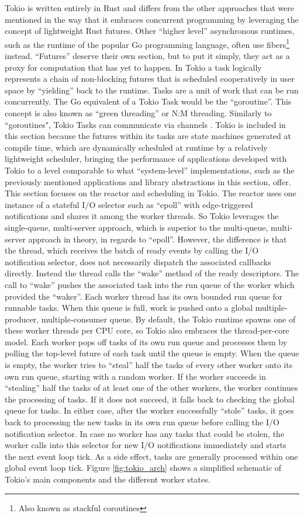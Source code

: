 Tokio is written entirely in Rust and differs from the other approaches that were mentioned in the way that it embraces concurrent programming by leveraging the concept of lightweight Rust futures. Other “higher level” asynchronous runtimes, such as the runtime of the popular Go programming language, often use fibers\footnote{Also known as stackful coroutines} instead. “Futures” deserve their own section, but to put it simply, they act as a proxy for computation that has yet to happen. In Tokio a task logically represents a chain of non-blocking futures that is scheduled cooperatively in user space by “yielding” back to the runtime. Tasks are a unit of work that can be run concurrently. The Go equivalent of a Tokio Task would be the “goroutine”. This concept is also known as “green threading” or N:M threading. Similarly to “goroutines", Tokio Tasks can communicate via channels \cite{doc:tokio_task}. Tokio is included in this section because the futures within its tasks are state machines generated at compile time, which are dynamically scheduled at runtime by a relatively lightweight scheduler, bringing the performance of applications developed with Tokio to a level comparable to what “system-level” implementations, such as the previously mentioned applications and library abstractions in this section, offer. This section focuses on the reactor and scheduling in Tokio. The reactor uses one instance of a stateful I/O selector such as “epoll” with edge-triggered notifications and shares it among the worker threads. So Tokio leverages the single-queue, multi-server approach, which is superior to the multi-queue, multi-server approach in theory, in regards to “epoll”. However, the difference is that the thread, which receives the batch of ready events by calling the I/O notification selector, does not necessarily dispatch the associated callbacks directly. Instead the thread calls the “wake” method of the ready descriptors. The call to “wake” pushes the associated task into the run queue of the worker which provided the “waker”. Each worker thread has its own bounded run queue for runnable tasks. When this queue is full, work is pushed onto a global multiple-producer, multiple-consumer queue. By default, the Tokio runtime spawns one of these worker threads per CPU core, so Tokio also embraces the thread-per-core model. Each worker pops off tasks of its own run queue and processes them by polling the top-level future of each task until the queue is empty. When the queue is empty, the worker tries to “steal” half the tasks of every other worker onto its own run queue, starting with a random worker. If the worker succeeds in “stealing” half the tasks of at least one of the other workers, the worker continues the processing of tasks. If it does not succeed, it falls back to checking the global queue for tasks. In either case, after the worker successfully “stole” tasks, it goes back to processing the new tasks in its own run queue before calling the I/O notification selector. In case no worker has any tasks that could be stolen, the worker calls into this selector for new I/O notifications immediately and starts the next event loop tick. As a side effect, tasks are generally processed within one global event loop tick. Figure \ref{fig:tokio_arch} shows a simplified schematic of Tokio’s main components and the different worker states.
